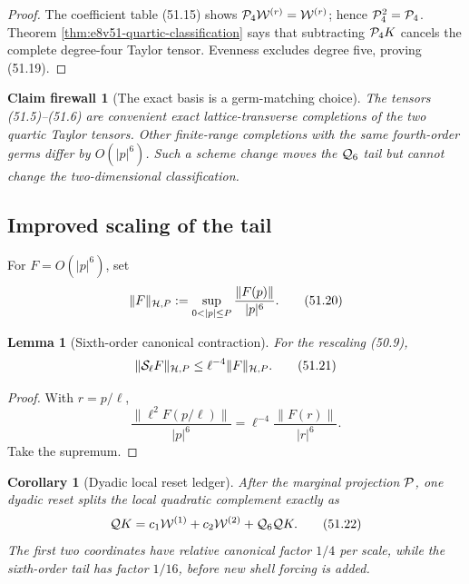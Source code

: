 \documentclass[11pt,oneside]{book}
\newtheorem{lemma}[theorem]{Lemma}
\newtheorem{corollary}[theorem]{Corollary}
\newtheorem{firewall}[theorem]{Claim firewall}
\theoremstyle{definition}
\theoremstyle{remark}
\begin{document}
\begin{proof}
The coefficient table (51.15) shows
\({\cal P}_4{\cal W}^{(r)}={\cal W}^{(r)}\); hence
\({\cal P}_4^2={\cal P}_4\).  Theorem
\ref{thm:e8v51-quartic-classification} says that subtracting
\({\cal P}_4K\) cancels the complete degree-four Taylor tensor.
Evenness excludes degree five, proving (51.19).
\end{proof}

\begin{firewall}[The exact basis is a germ-matching choice]
\label{fire:e8v51-germ-basis}
The tensors (51.5)--(51.6) are convenient exact
lattice-transverse completions of the two quartic Taylor tensors.
Other finite-range completions with the same fourth-order germs
differ by \(O(|p|^6)\).  Such a scheme change moves the
\({\cal Q}_6\) tail but cannot change the two-dimensional
classification.
\end{firewall}

\subsection{Improved scaling of the tail}

For \(F=O(|p|^6)\), set
\[
 \|F\|_{{\cal H},P}
 :=\sup_{0<|p|\le P}\frac{\|F(p)\|}{|p|^6}.                   \tag{51.20}
\]

\begin{lemma}[Sixth-order canonical contraction]
\label{lem:e8v51-sixth-contraction}
For the rescaling (50.9),
\[
 \|{\cal S}_\ell F\|_{{\cal H},P}
 \le\ell^{-4}\|F\|_{{\cal H},P}.                             \tag{51.21}
\]
\end{lemma}

\begin{proof}
With \(r=p/\ell\),
\[
 \frac{\|\ell^2F(p/\ell)\|}{|p|^6}
 =\ell^{-4}\frac{\|F(r)\|}{|r|^6}.
\]
Take the supremum.
\end{proof}

\begin{corollary}[Dyadic local reset ledger]
\label{cor:e8v51-dyadic-ledger}
After the marginal projection \({\cal P}\), one dyadic reset splits
the local quadratic complement exactly as
\[
 {\cal Q}K
 =c_1{\cal W}^{(1)}+c_2{\cal W}^{(2)}
  +{\cal Q}_6{\cal Q}K.                                     \tag{51.22}
\]
The first two coordinates have relative canonical factor \(1/4\)
per scale, while the sixth-order tail has factor \(1/16\), before
new shell forcing is added.
\end{corollary}
\end{document}
